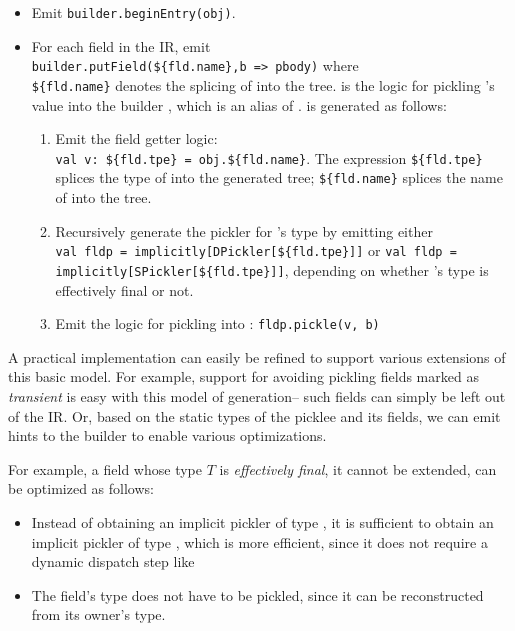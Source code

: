 \begin{itemize}

\item Emit \verb|builder.beginEntry(obj)|.

\item For each field  in the IR, emit \\\verb|builder.putField(${fld.name},b => pbody)|
where \\\verb|${fld.name}| denotes the splicing of 
into the tree.  is the logic for pickling 's value into
the builder , which is an alias of .  is generated
as follows:
  \begin{enumerate}

  \item Emit the field getter logic:
  \\\verb|val v: ${fld.tpe} = obj.${fld.name}|. The
  expression \verb|${fld.tpe}| splices the type of  into the generated
  tree; \verb|${fld.name}| splices the name of  into the tree.

  \item Recursively generate the pickler for 's type by emitting either
  \\\verb|val fldp = implicitly[DPickler[${fld.tpe}]]| or \verb|val fldp = implicitly[SPickler[${fld.tpe}]]|,
  depending on whether 's type is effectively final or not.

  \item Emit the logic for pickling  into : \verb|fldp.pickle(v, b)|
  \end{enumerate}
\end{itemize}

A practical implementation can easily be refined to support various extensions
of this basic model. For example, support for avoiding pickling fields marked
as {\em transient} is easy with this model of generation-- such fields can
simply be left out of the IR. Or, based on the static types of the picklee and
its fields, we can emit hints to the builder to enable various optimizations.

For example, a field whose type $T$ is {\em effectively final}, \ie it cannot
be extended, can be optimized as follows:

\begin{itemize}
\item Instead of obtaining an implicit pickler of type , it is
sufficient to obtain an implicit pickler of type , which is
more efficient, since it does not require a dynamic dispatch step like

\item The field's type does not have to be pickled, since it can be reconstructed
from its owner's type.
\end{itemize}

